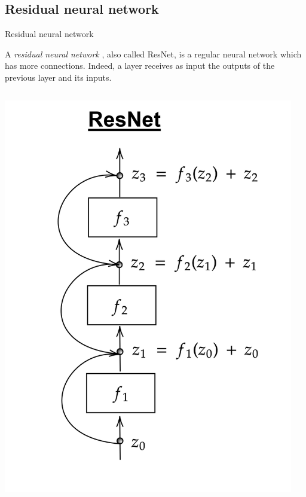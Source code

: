 \documentclass[11pt]{beamer}
\begin{document}
\subsection{Residual neural network} \label{rnn}
\begin{frame}{Residual neural network}

A\textit{ residual neural network} \cite{6}, also called ResNet, is a regular neural network which has more connections. Indeed, a layer receives as input the outputs of the previous layer and its inputs.

 \begin{columns}[t]
  \begin{column}{5cm}
\begin{center}
\includegraphics[scale=0.14]{resnet.png}
\end{center}
  \end{column}
  
  \begin{column}{5cm}
  \begin{center}
  ~
  

\end{center}
\end{column}
\end{columns}
\end{frame}
\end{document}
